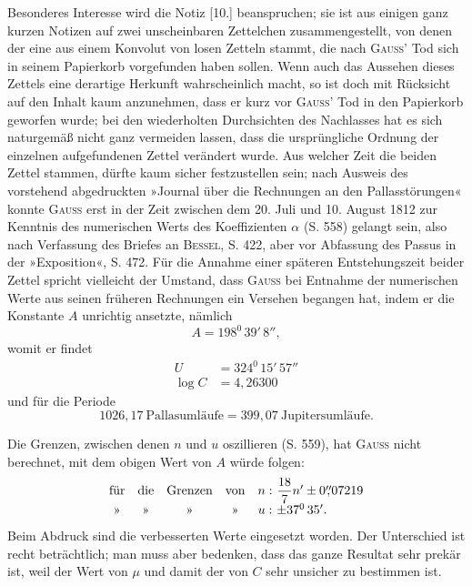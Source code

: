 \par\noindent\hspace*{\parindent}Besonderes Interesse wird die Notiz [10.] beanspruchen; sie ist aus
einigen ganz kurzen Notizen auf zwei unscheinbaren Zettelchen zusammengestellt,
von denen der eine aus einem Konvolut von losen Zetteln
stammt, die nach \textsc{Gauss}’ Tod sich in seinem Papierkorb vorgefunden haben sollen.
Wenn auch das Aussehen dieses Zettels eine derartige Herkunft wahrscheinlich
macht, so ist doch mit Rücksicht auf den Inhalt kaum anzunehmen, dass er kurz
vor \textsc{Gauss}’ Tod in den Papierkorb geworfen wurde; bei den wiederholten
Durchsichten des Nachlasses hat es sich naturgemäß nicht ganz vermeiden lassen,
dass die ursprüngliche Ordnung der einzelnen aufgefundenen Zettel verändert wurde.
Aus welcher Zeit die beiden Zettel stammen, dürfte kaum sicher festzustellen
sein; nach Ausweis des vorstehend abgedruckten »Journal über die Rechnungen an
den Pallasstörungen« konnte \textsc{Gauss} erst in der Zeit zwischen dem 20. Juli
und 10. August 1812 zur Kenntnis des numerischen Werts des Koeffizienten
\(\alpha\) (S. 558) gelangt sein, also nach Verfassung des Briefes an
\textsc{Bessel}, S. 422, aber vor Abfassung des Passus in der »Exposition«, S. 472.
Für die Annahme einer späteren Entstehungszeit beider Zettel spricht vielleicht
der Umstand, dass \textsc{Gauss} bei Entnahme der numerischen Werte aus seinen
früheren Rechnungen ein Versehen begangen hat, indem er die Konstante \(A\)
unrichtig ansetzte, nämlich
\[
A=198^0\,39'\,8'',
\]
\noindent womit er findet
\[
\begin{aligned}
U&=324^0\,15'\,57''\\
\log C&=4{,}26300
\end{aligned}
\]
\noindent und für die Periode
\[
1026{,}17\ \text{Pallasumläufe}=399{,}07\ \text{Jupitersumläufe}.
\]

\par\noindent\hspace*{\parindent}Die Grenzen, zwischen denen \(n\) und \(u\) oszillieren (S. 559), hat
\textsc{Gauss} nicht berechnet, mit dem obigen Wert von \(A\) würde folgen:
\[
\begin{array}{ccccc@{\ }l}
\text{für}&\text{die}&\text{Grenzen}&\text{von}&n:&\dfrac{18}{7}n'\pm0\overset{\prime\prime}{,}07219\\[3pt]
\text{»}&\text{»}&\text{»}&\text{»}&u:&\pm37^0\,35'.
\end{array}
\]
\noindent Beim Abdruck sind die verbesserten Werte eingesetzt worden. Der Unterschied
ist recht beträchtlich; man muss aber bedenken, dass das ganze Resultat sehr
prekär ist, weil der Wert von \(\mu\) und damit der von \(C\) sehr unsicher zu bestimmen ist.

